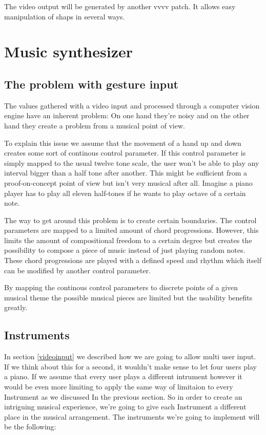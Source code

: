 \documentclass[titlepage, a4paper, 11pt]{scrartcl}
\begin{document}
The video output will be generated by another vvvv patch. It allows easy manipulation of shaps in several ways.

\section{Music synthesizer}

\subsection{The problem with gesture input} \label{gestureinput}

The values gathered with a video input and processed through a computer vision engine have an inherent problem:
On one hand they're noisy and on the other hand they create a problem from a musical point of view.

To explain this issue we assume that the movement of a hand up and down creates some sort of continous control parameter.
If this control parameter is simply mapped to the usual twelve tone scale, the user won't be able to play any
interval bigger than a half tone after another. This might be sufficient from a proof-on-concept point of view but
isn't very musical after all. Imagine a piano player has to play all eleven half-tones if he wants to play octave of a certain note.

The way to get around this problem is to create certain boundaries. The control parameters are mapped to a limited amount
of chord progressions. However, this limits the amount of compositional freedom to a certain degree but creates 
the possibility to compose a piece of music instead of just playing random notes.
These chord progressions are played with a defined speed and rhythm which itself can be modified by another control parameter.

By mapping the continous control parameters to discrete points of a given musical theme the possible musical pieces are limited but the usability benefits greatly.

\subsection{Instruments}


In section \ref{videoinput} we described how we are going to allow multi user input. If we think about this for a second, it wouldn't make sense to
let four users play a piano.  
If we assume that every user plays a different intrument however it would be even more limiting to apply the same way of limitaion to every Instrument as we discussed
In the previous section.
So in order to create an intriguing musical experience, we're going to give each Instrument a different place in the musical arrangement.
The instruments we're going to implement will be the following:
\end{document}
